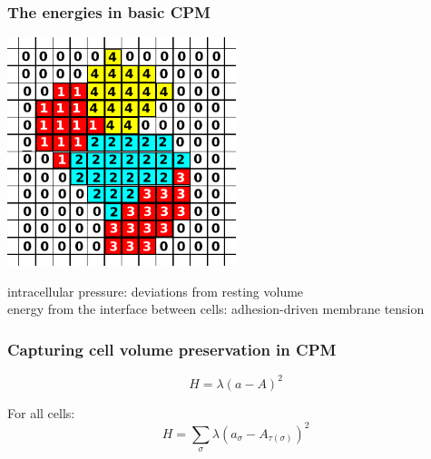 \documentclass[compress]{beamer}
\begin{document}
\begin{frame}
 \frametitle{The energies in basic CPM}
 
 \begin{center}
  \includegraphics[width=0.5\textwidth]{figures/cpm_layout.pdf}\\
     \end{center}
 
intracellular pressure: deviations from resting volume\\
energy from the interface between cells: adhesion-driven membrane tension
 \end{frame}

\begin{frame}
\frametitle{Capturing cell volume preservation in CPM}  
\[H = \lambda ( a - A)^2\]

For all cells:
$$ H = \sum_\sigma \lambda ( a_\sigma - A_{\tau(\sigma)}  )^2 $$
  
  

\end{frame}
\end{document}
